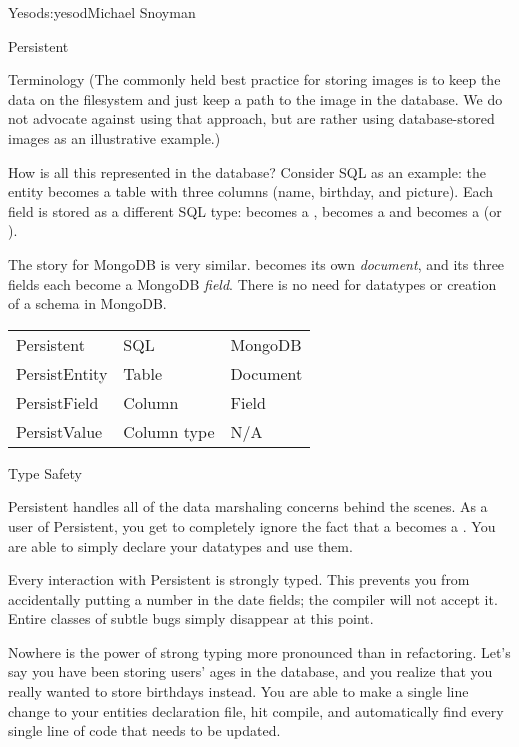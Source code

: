 \begin{aosachapter}{Yesod}{s:yesod}{Michael Snoyman}
\begin{aosasect1}{Persistent}
\begin{aosasect2}{Terminology}
(The commonly held best practice for storing images is to keep the data
on the filesystem and just keep a path to the image in the
database. We do not advocate against using that approach, but are
rather using database-stored images as an illustrative example.)

How is all this represented in the database? Consider SQL as an
example: the  entity becomes a table with three columns
(name, birthday, and picture). Each field is stored as a different SQL
type:  becomes a ,  becomes a
 and  becomes a  (or ).

The story for MongoDB is very similar.  becomes its own
\emph{document}, and its three fields each become a MongoDB
\emph{field}. There is no need for datatypes or creation of a schema
in MongoDB.

\vspace{8pt}
\begin{tabular}{lll}
Persistent & SQL & MongoDB \\
PersistEntity & Table & Document \\
PersistField & Column & Field \\
PersistValue & Column type & N/A \\
\end{tabular}
 
\end{aosasect2}

\begin{aosasect2}{Type Safety}

Persistent handles all of the data marshaling concerns behind the
scenes. As a user of Persistent, you get to completely ignore the fact
that a  becomes a . You are able to simply
declare your datatypes and use them.

Every interaction with Persistent is strongly typed. This prevents you
from accidentally putting a number in the date fields; the compiler
will not accept it. Entire classes of subtle bugs simply disappear at
this point.

Nowhere is the power of strong typing more pronounced than in
refactoring. Let's say you have been storing users' ages in the
database, and you realize that you really wanted to store birthdays
instead. You are able to make a single line change to your entities
declaration file, hit compile, and automatically find every single
line of code that needs to be updated.


\end{aosasect2}
\end{aosasect1}
\end{aosachapter}
